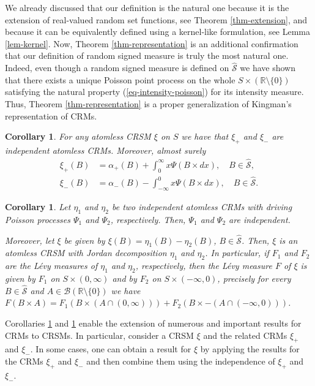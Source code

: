 \documentclass{article}
\theoremstyle{plain}
\newtheorem{corollary}[theorem]{Corollary}
\theoremstyle{remark}
\begin{document}
We already discussed that our definition is the natural one because it is the extension of real-valued random set functions, see Theorem \ref{thm-extension}, and because it can be equivalently defined using a kernel-like formulation, see Lemma \ref{lem-kernel}. Now, Theorem \ref{thm-representation} is an additional confirmation that our definition of random signed measure is truly the most natural one. Indeed, even though a random signed measure is defined on $\hat{\mathcal{S}}$ we have shown that there exists a unique Poisson point process on the whole $S\times (\mathbb{R}\setminus\{0\})$ satisfying the natural property (\ref{eq-intensity-poisson}) for its intensity measure. Thus, Theorem \ref{thm-representation} is a proper generalization of Kingman's representation of CRMs.


\begin{corollary}\label{co-two-CRSM}
	For any atomless CRSM $\xi$ on $S$ we have that $\xi_+$ and $\xi_-$ are independent atomless CRMs. Moreover, almost surely
	\begin{align*}
		\xi_+(B)&=\alpha_+(B)+\int_{0}^{\infty}x\Psi(B\times dx),\quad B\in\hat{\mathcal{S}},\\
		\xi_-(B)&=\alpha_-(B)-\int_{-\infty}^{0}x\Psi(B\times dx),\quad B\in\hat{\mathcal{S}}.
	\end{align*}
\end{corollary}

\begin{corollary}\label{co-two-CRSM-2}
	Let $\eta_1$ and $\eta_2$ be two independent atomless CRMs with driving Poisson processes $\Psi_1$ and $\Psi_2$, respectively. Then, $\Psi_1$ and $\Psi_2$ are independent. 
	
	Moreover, let $\xi$ be given by $\xi(B)=\eta_1(B)-\eta_2(B)$, $B\in\hat{\mathcal{S}}$. Then, $\xi$ is an atomless CRSM with Jordan decomposition $\eta_1$ and $\eta_2$. In particular, if $F_1$ and $F_2$ are the L\'{e}vy measures of $\eta_1$ and $\eta_2$, respectively, then the L\'{e}vy measure $F$ of $\xi$ is given by $F_1$ on $S\times(0,\infty)$ and by $F_2$ on $S\times(-\infty,0)$, precisely for every $B\in\hat{\mathcal{S}}$ and $A\in\mathcal{B}(\mathbb{R}\setminus\{0\})$ we have $F(B\times A)=F_1(B\times (A\cap(0,\infty)))+F_2(B\times -(A\cap(-\infty,0)))$.
\end{corollary}


Corollaries \ref{co-two-CRSM} and \ref{co-two-CRSM-2} enable the extension of numerous and important results for CRMs to CRSMs. In particular, consider a CRSM $\xi$ and the related CRMs $\xi_+$ and $\xi_-$. In some cases, one can obtain a result for $\xi$ by applying the results for the CRMs $\xi_+$ and $\xi_-$ and then combine them using the independence of $\xi_+$ and $\xi_-$. 
\end{document}
